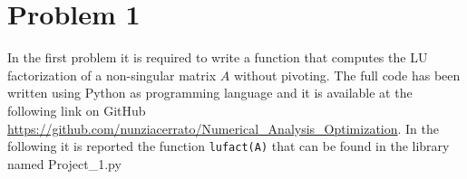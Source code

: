 \documentclass[a4paper,11pt]{report}
\begin{document}
\chapter{Problem 1}
In the first problem it is required to write a function that computes the LU factorization of a non-singular matrix $A$ without pivoting. The full code has been written using Python as programming language and it is available at the following link on GitHub \url{https://github.com/nunziacerrato/Numerical_Analysis_Optimization}.
In the following it is reported the function \texttt{lufact(A)} that can be found in the library named Project\_1.py
\end{document}
